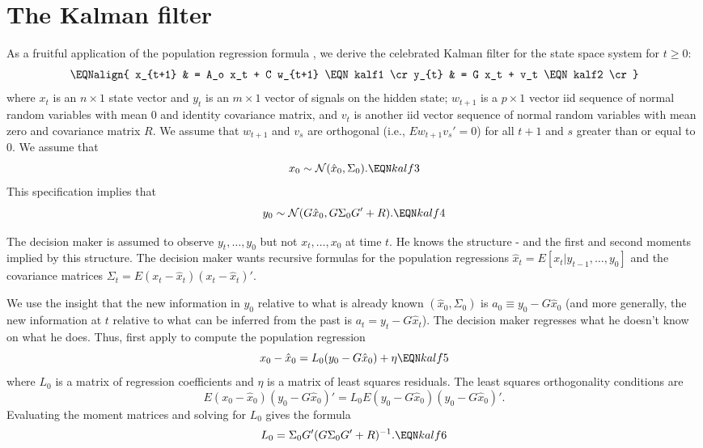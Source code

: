 \section{The Kalman filter}\label{sec:Kalman100}%
%
%
%
As a fruitful  application of the population regression formula
, we derive the celebrated Kalman filter for the
state space system for $t \geq 0$:
$$\EQNalign{ x_{t+1} & = A_o x_t + C w_{t+1} \EQN kalf1 \cr
             y_{t} & = G x_t + v_t \EQN kalf2 \cr} $$
where $x_t$ is an $n \times 1$ state vector and $y_t$ is an $m
\times 1$ vector of signals on the hidden state; $w_{t+1}$
is a $p \times 1$ vector iid sequence of normal random variables
with mean $0$ and identity covariance matrix, and $v_t$ is another
iid vector sequence of normal random variables with mean zero and
covariance matrix $R$.  We assume that $w_{t+1}$ and $v_s$
are orthogonal (i.e., $E w_{t+1} v_s'=0$) for all $t+1$ and $s$ greater than or equal to $0$.
We assume that
$$x_0 \sim {\cal N}(\hat x_0, \Sigma_0) . \EQN kalf3 $$
This specification implies that
$$ y_0 \sim {\cal N}(G \hat x_0, G \Sigma_0 G' + R). \EQN kalf4 $$

The decision maker is assumed to observe $y_t, \ldots, y_0$ but not $x_t, \ldots , x_0$ at time
$t$.  He knows the structure - and the first and second moments implied by this
structure.
The decision maker  wants recursive formulas for the population regressions $\hat x_t = E [ x_t | y_{t-1}, \ldots, y_0]$ and
the covariance matrices
$\Sigma_t = E (x_t -\hat x_t)(x_t -\hat x_t)'$.


%
We use the insight that the new information in $y_0$ relative to what is already
known $(\hat x_0, \Sigma_0)$ is $a_0 \equiv  y_0 - G \hat x_0 $ (and more generally, the new information at
$t$ relative to what can be inferred from the past is  $a_t = y_t - G \hat x_t$).  The decision maker regresses
what he doesn't know on what he does. Thus, first apply   to compute the population
regression
$$ x_0 - \hat x_0 = L_0 (y_0 - G \hat x_0)  + \eta \EQN kalf5 $$
where $L_0$ is a matrix of regression coefficients and $\eta $ is a matrix of least squares residuals.  The least
squares orthogonality conditions are
$$ E(x_0 -\hat x_0)(y_0 - G \hat x_0)' = L_0 E(y_0 - G \hat x_0)(y_0 - G \hat
x_0)'. $$ Evaluating  the moment matrices and solving for $L_0$  gives the formula
$$ L_0 = \Sigma_0 G'(G \Sigma_0 G'+R)^{-1}. \EQN kalf6 $$

